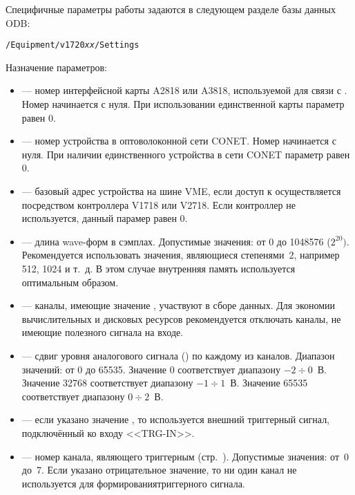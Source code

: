 Специфичные параметры работы \DEVICE{} задаются в следующем разделе базы данных ODB:

\medskip

{\tt /Equipment/v1720{\it xx}/Settings}

\medskip

Назначение параметров:

\begin{itemize}

\item {} --- номер интерфейсной карты A2818 или A3818, используемой для связи с \DEVICE{}. Номер начинается с нуля. При использовании единственной карты параметр равен 0.

\item {} --- номер устройства в оптоволоконной сети CONET. Номер начинается с нуля. При наличии единственного устройства в сети CONET параметр равен 0.

\item {} --- базовый адрес устройства на шине VME, если доступ к \DEVICE{} осуществляется посредством контроллера V1718 или V2718. Если контроллер не используется, данный парамер равен 0.

\item {} --- длина wave-форм в сэмплах. Допустимые значения: от 0 до 1048576 ($2^{20})$. Рекомендуется использовать значения, являющиеся степенями~2, например 512, 1024 и т.~д. В этом случае внутренняя память \DEVICE{} используется оптимальным образом.

\item {} --- каналы, имеющие значение , участвуют в сборе данных. Для экономии вычислительных и дисковых ресурсов рекомендуется отключать каналы, не имеющие полезного сигнала на входе.

\item {} --- сдвиг уровня аналогового сигнала () \cite{CaenUM3051AIS} по каждому из каналов. Диапазон значений: от 0 до 65535. Значение 0 соответствует диапазону $-2 \div 0$~В. Значение 32768 соответствует диапазону $-1 \div 1$~В. Значение 65535 соответствует диапазону $0 \div 2$~В. 

\item {} --- если указано значение , то используется внешний триггерный сигнал, подключённый ко входу <<TRG-IN>>.

\item {} --- номер канала, являющего триггерным (стр.~\pageref{sec_basic}). Допустимые значения: от~0 до~7. Если указано отрицательное значение, то ни один канал не используется для формированиятриггерного сигнала.


\end{itemize}
